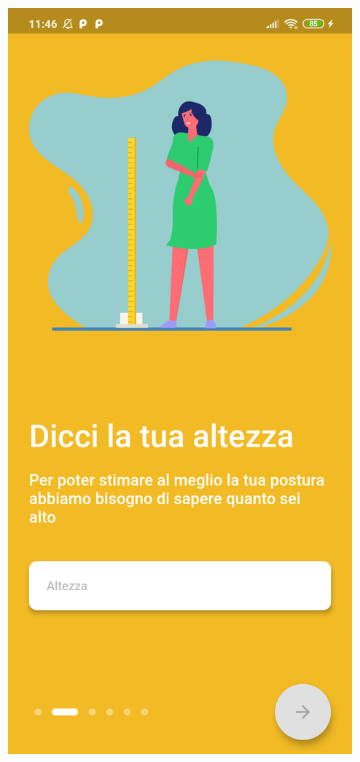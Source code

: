 \begin{figure}[!htb]
\begin{subfigure}{0.35\textwidth}
    \end{subfigure}
    \begin{subfigure}{0.35\textwidth}
        \includegraphics[width=\textwidth]{figures/screenshot/redmi_note_8t/height.png}

\end{subfigure}
\end{figure}
